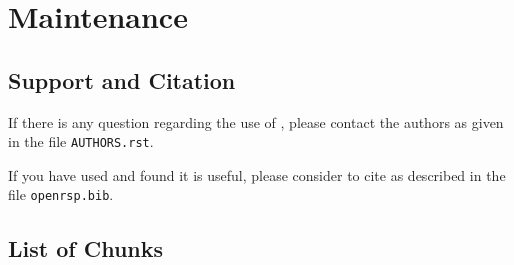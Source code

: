 \chapter{Maintenance}
\label{chapter-maintenance}

\section{Support and Citation}

If there is any question regarding the use of \LibName, please contact
the authors as given in the file \texttt{AUTHORS.rst}.

If you have used \LibName and found it is useful, please consider to cite
\LibName as described in the file \texttt{openrsp.bib}.

\section{List of Chunks}

\nowebchunks

